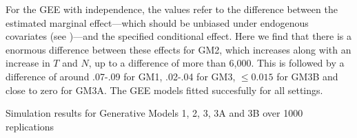 \documentclass[
  12pt,
  a4paper,
]{article}
\begin{document}
For the GEE with independence, the values refer to the difference
between the estimated marginal effect---which should be unbiased under
endogenous covariates (see )---and the specified conditional effect. Here we find that there
is a enormous difference between these effects for GM2, which increases
along with an increase in \(T\) and \(N\), up to a difference of more
than 6,000. This is followed by a difference of around .07-.09 for GM1,
.02-.04 for GM3, \(\leq 0.015\) for GM3B and close to zero for GM3A. The
GEE models fitted succesfully for all settings.

\begin{table}

\caption{\label{tbl-simulation-results}Simulation results for Generative
Models 1, 2, 3, 3A and 3B over 1000 replications}

\centering{

}
\end{table}
\end{document}
